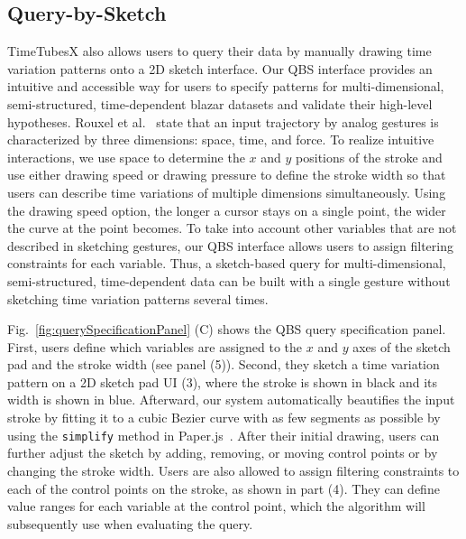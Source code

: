\subsection{Query-by-Sketch}\label{sec:QBS}
TimeTubesX also allows users to query their data by manually drawing time variation patterns onto a 2D sketch interface.
Our QBS interface provides an intuitive and accessible way for users to specify patterns for multi-dimensional, semi-structured, time-dependent blazar datasets and validate their high-level hypotheses.
Rouxel et al.~\cite{Rouxel2014} state that an input trajectory by analog gestures is characterized by three dimensions: space, time, and force.
To realize intuitive interactions, 
we use space to determine the $x$ and $y$ positions of the stroke
and use either drawing speed or drawing pressure to define the stroke width 
so that users can describe time variations of multiple dimensions simultaneously.
Using the drawing speed option, the longer a cursor stays on a single point, the wider the curve at the point becomes.
To take into account other variables that are not described in sketching gestures, 
our QBS interface allows users to assign filtering constraints for each variable.
Thus, a sketch-based query for multi-dimensional, semi-structured, time-dependent data can be built with a single gesture
without sketching time variation patterns several times.

Fig.~\ref{fig:querySpecificationPanel} (C) shows the QBS query specification panel.
First, users define which variables are assigned to the $x$ and $y$ axes of the sketch pad and the stroke width (see panel (5)).
Second, they sketch a time variation pattern on a 2D sketch pad UI (3),
where the stroke is shown in black and its width is shown in blue.
Afterward, our system automatically beautifies the input stroke by fitting it to a cubic Bezier curve with as few segments as possible by using the \texttt{\small simplify} method in Paper.js~\cite{paper_framework}.
After their initial drawing, users can further adjust the sketch
by adding, removing, or moving control points or by changing the stroke width.
Users are also allowed to assign filtering constraints to each of the control points on the stroke, as shown in part (4).
They can define value ranges for each variable at the control point, which the algorithm will subsequently use when evaluating the query.


